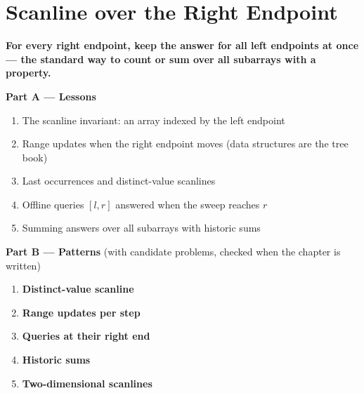 \chapter{Scanline over the Right Endpoint}
\label{ch:scanline}

\begin{tcolorbox}[enhanced, colback=white, colframe=secondaryblue, boxrule=1pt, arc=2mm]
\textbf{\large\textcolor{primaryblue}{For every right endpoint, keep the answer for all left endpoints at once --- the standard way to count or sum over all subarrays with a property.}}
\end{tcolorbox}


\begin{plannedbox}
\textbf{Part A --- Lessons}
\begin{enumerate}[leftmargin=*, label=\textbf{A\arabic*.}, itemsep=1pt]
    \item The scanline invariant: an array indexed by the left endpoint
    \item Range updates when the right endpoint moves (data structures are the tree book)
    \item Last occurrences and distinct-value scanlines
    \item Offline queries $[l, r]$ answered when the sweep reaches $r$
    \item Summing answers over all subarrays with historic sums
\end{enumerate}
\textbf{Part B --- Patterns} (with candidate problems, checked when the chapter is written)
\begin{enumerate}[leftmargin=*, label=\textbf{P\arabic*.}, itemsep=1pt]
    \item \textbf{Distinct-value scanline}
    \item \textbf{Range updates per step}
    \item \textbf{Queries at their right end}
    \item \textbf{Historic sums}
    \item \textbf{Two-dimensional scanlines}
\end{enumerate}
\end{plannedbox}
